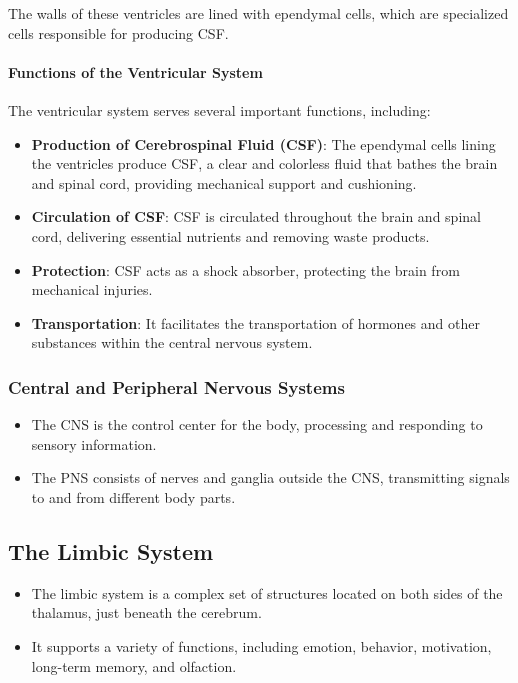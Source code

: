 \documentclass{article}
\begin{document}
The walls of these ventricles are lined with ependymal cells, which are specialized cells responsible for producing CSF.
\paragraph{Functions of the Ventricular System}

The ventricular system serves several important functions, including:

\begin{itemize}
  \item \textbf{Production of Cerebrospinal Fluid (CSF)}: The ependymal cells lining the ventricles produce CSF, a clear and colorless fluid that bathes the brain and spinal cord, providing mechanical support and cushioning.
  \item \textbf{Circulation of CSF}: CSF is circulated throughout the brain and spinal cord, delivering essential nutrients and removing waste products.
  \item \textbf{Protection}: CSF acts as a shock absorber, protecting the brain from mechanical injuries.
  \item \textbf{Transportation}: It facilitates the transportation of hormones and other substances within the central nervous system.
\end{itemize}

\subsubsection{Central and Peripheral Nervous Systems}
\begin{itemize}
    \item The CNS is the control center for the body, processing and responding to sensory information.
    \item The PNS consists of nerves and ganglia outside the CNS, transmitting signals to and from different body parts.
\end{itemize}

\subsection{The Limbic System}
\begin{itemize}
    \item The limbic system is a complex set of structures located on both sides of the thalamus, just beneath the cerebrum.
    \item It supports a variety of functions, including emotion, behavior, motivation, long-term memory, and olfaction.
\end{itemize}
\end{document}
